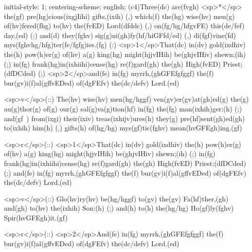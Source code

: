 initial-style: 1;
centering-scheme: english;
(c4)Three(dc) are(fvgh) <sp>*</sp> the(gf) pre(hg)cious(ixgjIihi) gifts,(ixih) (,) which(f) the(hg) wise(hv) men(g) of(hv)fered(fhg) to(hv) the(fvED) Lord(dfddc) (,) on(fg/hg/hfgvFE) this(de/fef) day,(ed) (;) and(d) they(fghv) sig(g)ni(gh)fy(hf/hiGFfd/ed) (,) di(fgf)vine(fd) mys(fghvhg/hfg)ter(fe/fgfg)ies.(fg) (:) <sp>1</sp>That(dc) in(dv) gold(ixdhiv) the(h) pow(h)er(g) of(hv) a(g) king(hg) might(hjjvIHih) be(ghjvIHiv) shewn;(ih) (;) in(fg) frank(hg)in(ixhiihi)cense(hg) re(f)gard(gh) the(gh) High(fvED) Priest;(dfDCded) (;) <sp>2</sp>and(fe) in(fg) myrrh,(ghGFEfgfggf) the(f) bur(gv)i(f)al(gffvEDed) of(dgFEfv) the(dc/defv) Lord.(ed)

<sp>v</sp>(::) The(hv) wise(hv) men(hg/hggf) ven(gv)er(gv)at(gh)ed(g) the(g) au(g)thor(g) of(g) our(g) sal(g)va(g)tion(hf) in(fg) the(fg) man(ixhih)ger:(h) (;) and(gf~) from(ixgi) their(ixiv) treas(ixhijv)ures(h) they(g) pre(hf)sent(gh)ed(gh) to(ixhih) him(h) (,) gifts(h) of(hg/hg) mys(gf)tic(fghv) mean(hvGFEgh)ing.(gf)

<sp>r</sp>(::) <sp>1</sp>That(dc) in(dv) gold(ixdhiv) the(h) pow(h)er(g) of(hv) a(g) king(hg) might(hjjvIHih) be(ghjvIHiv) shewn;(ih) (;) in(fg) frank(hg)in(ixhiihi)cense(hg) re(f)gard(gh) the(gh) High(fvED) Priest;(dfDCded) (;) and(fe) in(fg) myrrh,(ghGFEfgfggf) the(f) bur(gv)i(f)al(gffvEDed) of(dgFEfv) the(dc/defv) Lord.(ed)

<sp>v</sp>(::) Glo(hv)ry(hv) be(hg/hggf) to(gv) the(gv) Fa(hf)ther,(gh) and(gh) to(hv) the(ixhih) Son:(h) (;) and(h) to(h) the(hg/hg) Ho(gf)ly(fghv) Spir(hvGFEgh)it.(gf)

<sp>r</sp>(::) <sp>2</sp>And(fe) in(fg) myrrh,(ghGFEfgfggf) the(f) bur(gv)i(f)al(gffvEDed) of(dgFEfv) the(dc/defv) Lord.(ed)